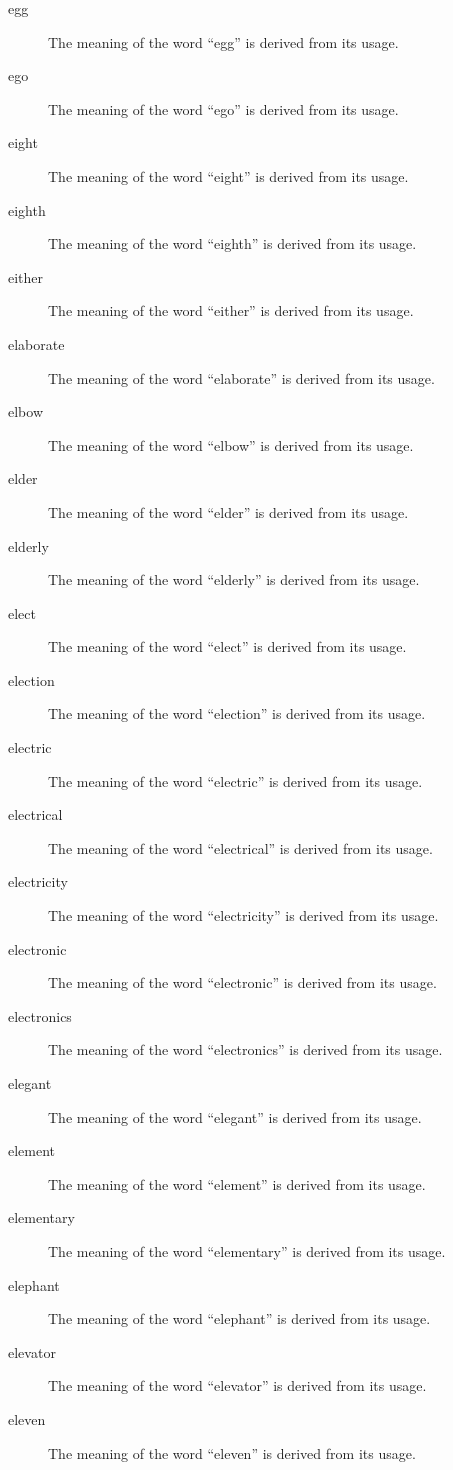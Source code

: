 \documentclass[12pt, letterpaper]{memoir}
\begin{document}
\begin{description}
\item[egg] The meaning of the word ``egg'' is derived from its usage.
\item[ego] The meaning of the word ``ego'' is derived from its usage.
\item[eight] The meaning of the word ``eight'' is derived from its usage.
\item[eighth] The meaning of the word ``eighth'' is derived from its usage.
\item[either] The meaning of the word ``either'' is derived from its usage.
\item[elaborate] The meaning of the word ``elaborate'' is derived from its usage.
\item[elbow] The meaning of the word ``elbow'' is derived from its usage.
\item[elder] The meaning of the word ``elder'' is derived from its usage.
\item[elderly] The meaning of the word ``elderly'' is derived from its usage.
\item[elect] The meaning of the word ``elect'' is derived from its usage.
\item[election] The meaning of the word ``election'' is derived from its usage.
\item[electric] The meaning of the word ``electric'' is derived from its usage.
\item[electrical] The meaning of the word ``electrical'' is derived from its usage.
\item[electricity] The meaning of the word ``electricity'' is derived from its usage.
\item[electronic] The meaning of the word ``electronic'' is derived from its usage.
\item[electronics] The meaning of the word ``electronics'' is derived from its usage.
\item[elegant] The meaning of the word ``elegant'' is derived from its usage.
\item[element] The meaning of the word ``element'' is derived from its usage.
\item[elementary] The meaning of the word ``elementary'' is derived from its usage.
\item[elephant] The meaning of the word ``elephant'' is derived from its usage.
\item[elevator] The meaning of the word ``elevator'' is derived from its usage.
\item[eleven] The meaning of the word ``eleven'' is derived from its usage.

\end{description}
\end{document}
